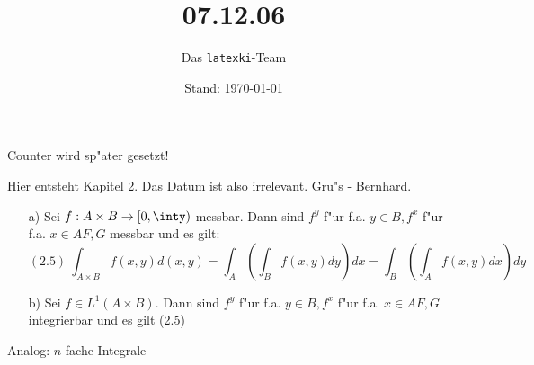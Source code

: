 \documentclass[a4paper,11pt]{book}
\title{07.12.06}
\author{Das \texttt{latexki}-Team\\[8 cm]}
\date{Stand: \today}
\newcommand{\R}{{\mathbb R}}
\newcommand{\C}{{\mathbb C}}
\newcommand{\N}{{\mathbb N}}
\theoremstyle{nonumberplain}
\begin{document}
Counter wird sp"ater gesetzt!

Hier entsteht Kapitel 2. Das Datum ist also irrelevant. Gru"s - Bernhard.\\

\begin{BspNO}[s. 1.68]
$R' = L, L' = R$\\
Alternativ: $(Lx|y) = \sum_{k=1}^{\infty} x_{k+1} \overline{y_k} \stackrel{j=k+1}{=} \sum_{j=2}^{\infty} x_j \overline{y_{j-1} = (x,Ry)$\\
Insbesondere: $T$ sa $\Leftrightarrow a_{kl} = \overline{a_{lk}} \ \forall\, k,l \in \N$.\\
Schreibe $z \in \R^{n \times n}$ als $z = (x,y)$ mit $x \in \R^n, y \in \R^n$. Seien $A \in \LL_m, B \in \LL_n \Rightarrow A \times B \in L_{m+n}$.\\
F"ur $f: A \times B \rightarrow \C$ bzw $[0,\infty)$ schreiben wir $f^y(x) = f(x,y) \ (y \in B$ fest) und $f^x(y) = f(x,y) \ (x \in A$ fest) sowie (soweit existent):
\[
F(x) = \int_B f(x,y)dy \ , x \in A; \quad G(y) = \int_A f(x,y)dx \ , y \in B
\]
(setze $F(x),G(y) = 0$, falls die Integrale nicht existieren.)
\end{BspNO}



\begin{TheoNO}[Fubini]
\begin{enumerate}
\item[a)] Sei $f: A \times B \rightarrow [0,\inty)$ messbar. Dann sind $f^y$ f"ur f.a. $y \in B, f^x$ f"ur f.a. $x \in A F,G$ messbar und es gilt:
\[
(2.5) \ \int_{A \times B} f(x,y)d(x,y) = \int_A ( \int_B f(x,y)dy)dx = \int_B ( \int_A f(x,y)dx)dy
\]

\item[b)] Sei $f \in L^1(A \times B)$. Dann sind $f^y$ f"ur f.a. $y \in B, f^x$ f"ur f.a. $x \in A F,G$ integrierbar und es gilt (2.5)
\end{enumerate}
\end{TheoNO}


\begin{BemNO}
Analog: $n$-fache Integrale
\end{BemNO}
\end{document}
